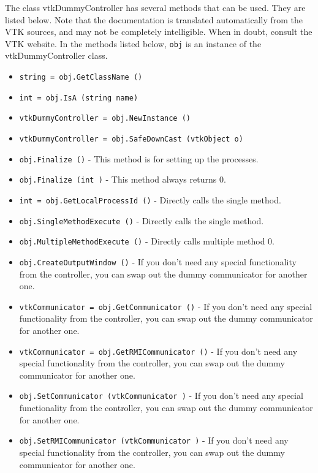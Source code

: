 The class vtkDummyController has several methods that can be used.
  They are listed below.
Note that the documentation is translated automatically from the VTK sources,
and may not be completely intelligible.  When in doubt, consult the VTK website.
In the methods listed below, \verb|obj| is an instance of the vtkDummyController class.
\begin{itemize}
\item  \verb|string = obj.GetClassName ()|

\item  \verb|int = obj.IsA (string name)|

\item  \verb|vtkDummyController = obj.NewInstance ()|

\item  \verb|vtkDummyController = obj.SafeDownCast (vtkObject o)|

\item  \verb|obj.Finalize ()| -  This method is for setting up the processes.

\item  \verb|obj.Finalize (int )| -  This method always returns 0.

\item  \verb|int = obj.GetLocalProcessId ()| -  Directly calls the single method.

\item  \verb|obj.SingleMethodExecute ()| -  Directly calls the single method.

\item  \verb|obj.MultipleMethodExecute ()| -  Directly calls multiple method 0.

\item  \verb|obj.CreateOutputWindow ()| -  If you don't need any special functionality from the controller, you
 can swap out the dummy communicator for another one.

\item  \verb|vtkCommunicator = obj.GetCommunicator ()| -  If you don't need any special functionality from the controller, you
 can swap out the dummy communicator for another one.

\item  \verb|vtkCommunicator = obj.GetRMICommunicator ()| -  If you don't need any special functionality from the controller, you
 can swap out the dummy communicator for another one.

\item  \verb|obj.SetCommunicator (vtkCommunicator )| -  If you don't need any special functionality from the controller, you
 can swap out the dummy communicator for another one.

\item  \verb|obj.SetRMICommunicator (vtkCommunicator )| -  If you don't need any special functionality from the controller, you
 can swap out the dummy communicator for another one.

\end{itemize}
